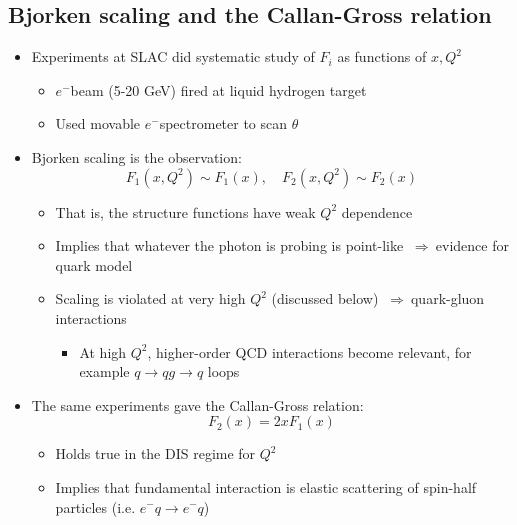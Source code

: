 \documentclass[11pt]{article}
\newcommand{\el}{\ensuremath{e^{-}}}
\newcommand{\thus}{\ensuremath{~\Rightarrow~}}
\begin{document}
\subsection{Bjorken scaling and the Callan-Gross relation}
\begin{itemize}
  \item Experiments at SLAC did systematic study of $F_i$ as functions of $x,Q^2$
  \begin{itemize}
    \item \el beam (5-20 GeV) fired at liquid hydrogen target
    \item Used movable \el spectrometer to scan $\theta$
  \end{itemize}
  \item Bjorken scaling is the observation:
  \begin{equation}
    F_1(x,Q^2) \sim F_1(x),\quad F_2(x,Q^2)\sim F_2(x)
  \end{equation}
  \begin{itemize}
    \item That is, the structure functions have weak $Q^2$ dependence
    \item Implies that whatever the photon is probing is point-like \thus evidence for quark model
    \item Scaling is violated at very high $Q^2$ (discussed below) \thus quark-gluon interactions
    \begin{itemize}
      \item At high $Q^2$, higher-order QCD interactions become relevant, for example $q\rightarrow qg \rightarrow q$ loops
    \end{itemize}
  \end{itemize}
  \item The same experiments gave the Callan-Gross relation:
  \begin{equation}
    F_2(x) = 2xF_1(x)
  \end{equation}
  \begin{itemize}
    \item Holds true in the DIS regime for $Q^2$
    \item Implies that fundamental interaction is elastic scattering of spin-half particles (i.e. $\el q\rightarrow \el q$)
  \end{itemize}
\end{itemize}
\end{document}

